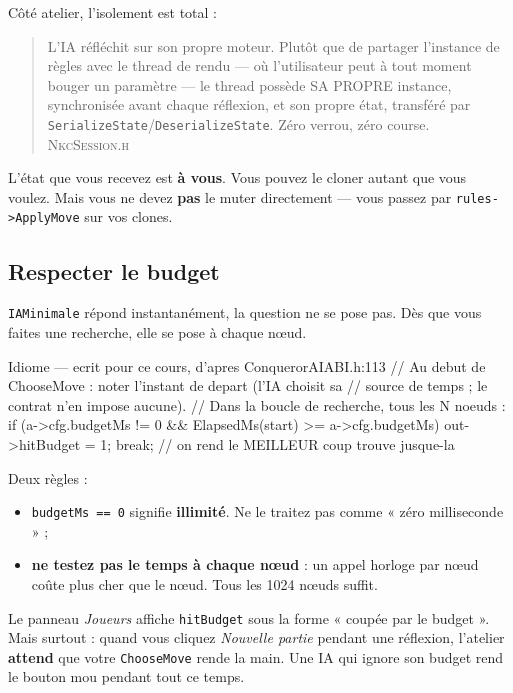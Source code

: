 Côté atelier, l'isolement est total :

\begin{quote}\small
L'IA réfléchit sur son propre moteur. Plutôt que de partager l'instance de règles
avec le thread de rendu — où l'utilisateur peut à tout moment bouger un
paramètre — le thread possède SA PROPRE instance, synchronisée avant chaque
réflexion, et son propre état, transféré par
\texttt{SerializeState}/\texttt{DeserializeState}. Zéro verrou, zéro course.
\hfill\textsc{NkcSession.h}
\end{quote}

L'état que vous recevez est \textbf{à vous}. Vous pouvez le cloner autant que vous
voulez. Mais vous ne devez \textbf{pas} le muter directement — vous passez par
\texttt{rules->ApplyMove} sur vos clones.

\subsection{Respecter le budget}

\texttt{IAMinimale} répond instantanément, la question ne se pose pas. Dès que
vous faites une recherche, elle se pose à chaque nœud.

\begin{nkcode}{Idiome — ecrit pour ce cours, d'apres ConquerorAIABI.h:113}
// Au debut de ChooseMove : noter l'instant de depart (l'IA choisit sa
// source de temps ; le contrat n'en impose aucune).
// Dans la boucle de recherche, tous les N noeuds :
if (a->cfg.budgetMs != 0 && ElapsedMs(start) >= a->cfg.budgetMs) {
    out->hitBudget = 1;
    break;                       // on rend le MEILLEUR coup trouve jusque-la
}
\end{nkcode}

Deux règles :

\begin{itemize}
  \item \texttt{budgetMs == 0} signifie \textbf{illimité}. Ne le traitez pas
        comme « zéro milliseconde » ;
  \item \textbf{ne testez pas le temps à chaque nœud} : un appel horloge par nœud
        coûte plus cher que le nœud. Tous les 1024 nœuds suffit.
\end{itemize}

\begin{nkpiege}
Le panneau \emph{Joueurs} affiche \texttt{hitBudget} sous la forme « coupée par le
budget ». Mais surtout : quand vous cliquez \emph{Nouvelle partie} pendant une
réflexion, l'atelier \textbf{attend} que votre \texttt{ChooseMove} rende la main.
Une IA qui ignore son budget rend le bouton mou pendant tout ce temps.
\end{nkpiege}

